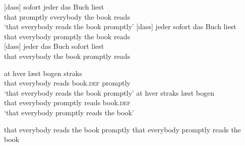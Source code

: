 \eal
\ex
\label{ex-m-j-b-l} 
\gll {}[dass] sofort jeder das Buch liest\\
     \spacebr{}that promptly everybody the book reads\\\german
\glt `that everybody reads the book promptly'
\ex
\label{ex-j-m-b-l} 
\gll {}[dass] jeder sofort das Buch liest\\
     \spacebr{}that everybody promptly the book reads\\ 
\ex
\label{ex-j-b-m-l}
\gll {}[dass] jeder das Buch sofort liest\\
    \spacebr{}that everybody the book promptly reads\\
\zl


\eal
\ex 
\gll at hver læst bogen straks\\
     that everybody reads book.\textsc{def} promptly\\ \danish
\glt `that everybody reads the book promptly'
\ex 
\gll at hver straks læst bogen\\
     that everybody promptly reads book.\textsc{def}\\
\glt `that everybody promptly reads the book'
\zl

\eal
\ex that everybody reads the book promptly
\ex that everybody promptly reads the book
\zl


